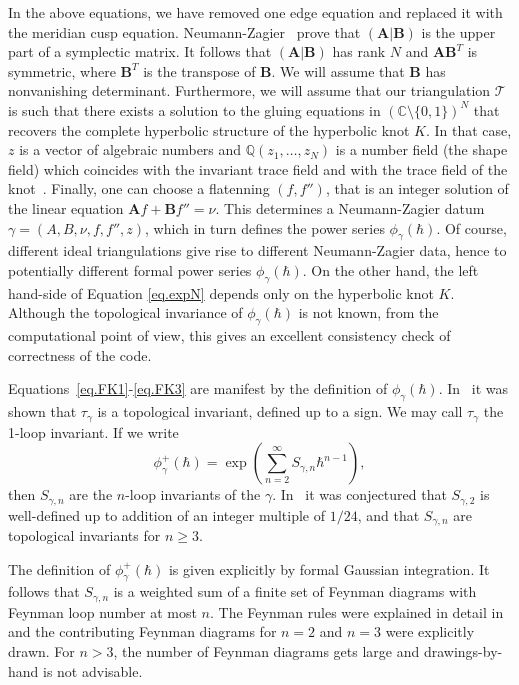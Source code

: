 \documentclass[12pt]{amsart}
\theoremstyle{definition}
\def\BQ{\mathbb Q}
\def\BC{\mathbb C}
\def\calT{\mathcal T}
\def\ga{\gamma}
\newcommand{\mb}{\mathbf}
\begin{document}
In the above equations, we have
removed one edge equation and replaced it with the meridian cusp equation.
Neumann-Zagier~\cite{NZ} prove that $(\mb A|\mb B)$ is the upper part of a 
symplectic matrix. It follows that $(\mb A|\mb B)$ has rank $N$ and 
$\mb A \mb B^T$ is symmetric, where $\mb B^T$ is the transpose of $\mb B$.
We will assume that $\mb B$ has nonvanishing determinant. Furthermore,
we will assume that our triangulation $\calT$ is such that there exists a 
solution to the gluing equations in $(\BC\setminus\{0,1\})^N$ that recovers
the complete hyperbolic structure of the hyperbolic knot $K$. In that
case, $z$ is a vector of algebraic numbers and $\BQ(z_1,\dots,z_N)$ is a 
number field (the shape field) which coincides with the invariant trace field
and with the trace field of the knot~\cite[Thm.2.2,2.4]{NR}. Finally, one
can choose a flatenning $(f,f'')$, that is an integer solution of the 
linear equation $\mb A f + \mb B f'' = \nu$. This determines a 
Neumann-Zagier datum $\ga=(A,B,\nu,f,f'',z)$, which in turn defines  
the power series $\phi_{\gamma}(\hbar)$. Of course, different ideal 
triangulations give rise to different Neumann-Zagier data, hence to 
potentially different formal power series $\phi_{\gamma}(\hbar)$. On the other 
hand, the left hand-side of Equation \eqref{eq.expN} depends only on the
hyperbolic knot $K$. Although the topological invariance of 
$\phi_{\gamma}(\hbar)$ is not known, from the computational point of view,
this gives an excellent consistency check of correctness of the code.

Equations~\eqref{eq.FK1}-\eqref{eq.FK3} are manifest by the definition of
$\phi_\gamma(\hbar)$. In~\cite{DG} it was shown that $\tau_\gamma$ is a 
topological invariant, defined up to a sign. We may call $\tau_\gamma$
the 1-loop invariant. If we write
$$
\phi^+_\gamma(\hbar)=\exp\left(\sum_{n=2}^\infty S_{\gamma,n}\hbar^{n-1}
\right),
$$
then $S_{\gamma,n}$ are the $n$-loop invariants of the $\ga$. In~\cite{DG}
it was conjectured that $S_{\gamma,2}$ is well-defined up to addition of
an integer multiple of $1/24$, and that $S_{\gamma,n}$ are topological
invariants for $n \geq 3$.
 
The definition of $\phi^+_\gamma(\hbar)$ is given explicitly by formal
Gaussian integration. It follows that $S_{\gamma,n}$ is a weighted sum
of a finite set of Feynman diagrams with Feynman loop number at most $n$. 
The Feynman rules were explained in
detail in~\cite[Sec.1.6-1.8]{DG} and the contributing Feynman diagrams for
$n=2$ and $n=3$ were explicitly drawn. For $n>3$, the number of Feynman 
diagrams gets large and drawings-by-hand is not advisable. 
\end{document}
